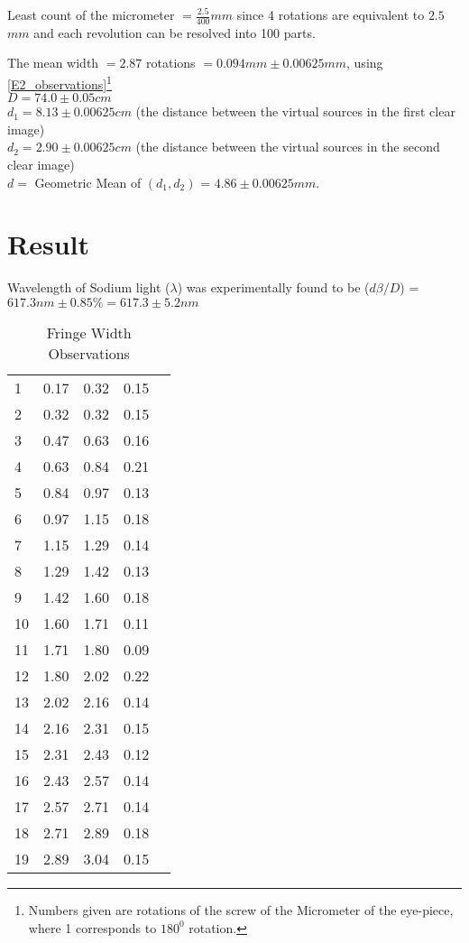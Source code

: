 	Least count of the micrometer $=\frac{2.5}{400} mm$ since 4 rotations are equivalent to $2.5$ $mm$ and each revolution can be resolved into 100 parts.
	\par
	The mean width $=2.87$ rotations $=0.094 mm \pm 0.00625 mm$, using \autoref{E2_observations}\footnote{Numbers given are rotations of the screw of the Micrometer of the eye-piece, where 1 corresponds to $180^{0}$ rotation.}\\
	
	$D=74.0 \pm 0.05 cm$ \\
	$d_{1}=8.13 \pm 0.00625 cm$ (the distance between the virtual sources in the first clear image)\\
	$d_{2}=2.90 \pm 0.00625 cm$ (the distance between the virtual sources in the second clear image)\\
	$d=$ Geometric Mean of $(d_{1},d_{2})$ = $4.86 \pm 0.00625 mm$.
	\par	

\section{Result}
	Wavelength of Sodium light ($\lambda$) was experimentally found to be ($d\beta /D$) = $617.3 nm \pm 0.85\% = 617.3 \pm 5.2 nm$

	\begin{table}
		\myfloatalign
		\begin{tabularx}{\textwidth}{Xllll}
			\hline
			\tableheadline{Serial} 	&	\tableheadline{Initial Screw Position} & \tableheadline{Final Screw Position} & \tableheadline{Fringe Width}\\
			\hline
				1	&	0.17	&	0.32	&	0.15\\
				2	&	0.32	&	0.32	&	0.15\\
				3	&	0.47	&	0.63	&	0.16\\
				4	&	0.63	&	0.84	&	0.21\\
				5	&	0.84	&	0.97	&	0.13\\
				6	&	0.97	&	1.15	&	0.18\\
				7	&	1.15	&	1.29	&	0.14\\
				8	&	1.29	&	1.42	&	0.13\\
				9	&	1.42	&	1.60	&	0.18\\
				10	&	1.60	&	1.71	&	0.11\\
				11	&	1.71	&	1.80	&	0.09\\
				12	&	1.80	&	2.02	&	0.22\\
				13	&	2.02	&	2.16	&	0.14\\
				14	&	2.16	&	2.31	&	0.15\\
				15	&	2.31	&	2.43	&	0.12\\
				16	&	2.43	&	2.57	&	0.14\\
				17	&	2.57	&	2.71	&	0.14\\
				18	&	2.71	&	2.89	&	0.18\\
				19	&	2.89	&	3.04	&	0.15\\
			\hline
		\end{tabularx}
		\caption{Fringe Width Observations}
		\label{E2_observations}
	\end{table}

